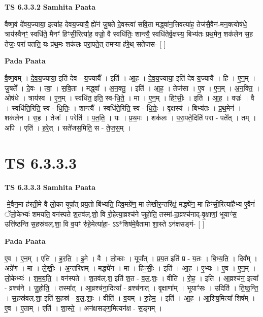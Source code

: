 \documentclass[17pt]{extarticle}
\begin{document}
\textbf{TS 6.3.3.2 } \newline
\textbf{Samhita Paata} \newline

वैष्ण॒वं दे॑वय॒ज्याया॒ इत्या॑ह देवय॒ज्यायै॒ ह्ये॑नं जु॒षते॑ दे॒वस्त्वा॑ सवि॒ता मद्ध्वा॑न॒त्तिवत्या॑ह॒ तेज॑सै॒वैन॑-मन॒क्त्योष॑धे॒ त्राय॑स्वैनꣳ॒॒ स्वधि॑ते॒ मैनꣳ॑ हिꣳसी॒रित्या॑ह॒ वज्रो॒ वै स्वधि॑तिः॒ शान्त्यै॒ स्वधि॑तेर्वृ॒क्षस्य॒ बिभ्य॑तः प्रथ॒मेन॒ शक॑लेन स॒ह तेजः॒ परा॑ पतति॒ यः प्र॑थ॒मः शक॑लः परा॒पते॒त् तमप्या ह॑रे॒थ् सते॑जस- [  ] \newline

\textbf{Pada Paata} \newline

वै॒ष्ण॒वम् । दे॒व॒य॒ज्याया॒ इति॑ देव - य॒ज्यायै᳚ । इति॑ । आ॒ह॒ । दे॒व॒य॒ज्याया॒ इति॑ देव-य॒ज्यायै᳚ । हि । ए॒न॒म् । जु॒षते᳚ । दे॒वः । त्वा॒ । स॒वि॒ता । मद्ध्वा᳚ । अ॒न॒क्तु॒ । इति॑ । आ॒ह॒ । तेज॑सा । ए॒व । ए॒न॒म् । अ॒न॒क्ति॒ । ओष॑धे । त्राय॑स्व । ए॒न॒म् । स्वधि॑त॒ इति॒ स्व-धि॒ते॒ । मा । ए॒न॒म् । हिꣳ॒॒सीः॒ । इति॑ । आ॒ह॒ । वज्रः॑ । वै । स्वधि॑ति॒रिति॒ स्व - धि॒तिः॒ । शान्त्यै᳚ । स्वधि॑ते॒रिति॒ स्व - धि॒तेः॒ । वृ॒क्षस्य॑ । बिभ्य॑तः । प्र॒थ॒मेन॑ । शक॑लेन । स॒ह । तेजः॑ । परेति॑ । प॒त॒ति॒ । यः । प्र॒थ॒मः । शक॑लः । प॒रा॒पते॒दिति॑ परा - पते᳚त् । तम् । अपि॑ । एति॑ । ह॒रे॒त् । सते॑जस॒मिति॒ स - ते॒ज॒स॒म् ।  \newline





\section{ TS 6.3.3.3 }

\textbf{TS 6.3.3.3 } \newline
\textbf{Samhita Paata} \newline

-मे॒वैन॒मा ह॑रती॒मे वै लो॒का यूपा᳚त् प्रय॒तो बि॑भ्यति॒ दिव॒मग्रे॑ण॒ मा ले॑खीर॒न्तरि॑क्षं॒ मद्ध्ये॑न॒ मा हिꣳ॑सी॒रित्या॑है॒भ्य ए॒वैनं॑ ॅलो॒केभ्यः॑ शमयति॒ वन॑स्पते श॒तव॑ल्.शो॒ वि रो॒हेत्या॒व्रश्च॑ने जुहोति॒ तस्मा॑-दा॒व्रश्च॑नाद्-वृ॒क्षाणां॒ भूयाꣳ॑स॒ उत्ति॑ष्ठन्ति स॒हस्र॑वल्.शा॒ वि व॒यꣳ रु॑हे॒मेत्या॑हा॒- ऽऽ*शिष॑मे॒वैतामा शा॒स्ते ऽन॑क्षसङ्गं- [  ] \newline

\textbf{Pada Paata} \newline

ए॒व । ए॒न॒म् । एति॑ । ह॒र॒ति॒ । इ॒मे । वै । लो॒काः । यूपा᳚त् । प्र॒य॒त इति॑ प्र - य॒तः । बि॒भ्य॒ति॒ । दिव᳚म् । अग्रे॑ण । मा । ले॒खीः॒ । अ॒न्तरि॑क्षम् । मद्ध्ये॑न । मा । हिꣳ॒॒सीः॒ । इति॑ । आ॒ह॒ । ए॒भ्यः । ए॒व । ए॒न॒म् । लो॒केभ्यः॑ । श॒म॒य॒ति॒ । वन॑स्पते । श॒तव॑ल्.श॒ इति॑ श॒त - व॒ल॒.शः॒ । वीति॑ । रो॒ह॒ । इति॑ । आ॒व्रश्च॑न॒ इत्या᳚ - व्रश्च॑ने । जु॒हो॒ति॒ । तस्मा᳚त् । आ॒व्रश्च॑ना॒दित्या᳚ - व्रश्च॑नात् । वृ॒क्षाणा᳚म् । भूयाꣳ॑सः । उदिति॑ । ति॒ष्ठ॒न्ति॒ । स॒हस्र॑वल्.शा॒ इति॑ स॒हस्र॑ - व॒ल॒.शाः॒ । वीति॑ । व॒यम् । रु॒हे॒म॒ । इति॑ । आ॒ह॒ । आ॒शिष॒मित्या᳚-शिष᳚म् । ए॒व । ए॒ताम् । एति॑ । शा॒स्ते॒ । अन॑क्षसङ्ग॒मित्यन॑क्ष - स॒ङ्गम् ।  \newline
\end{document}
